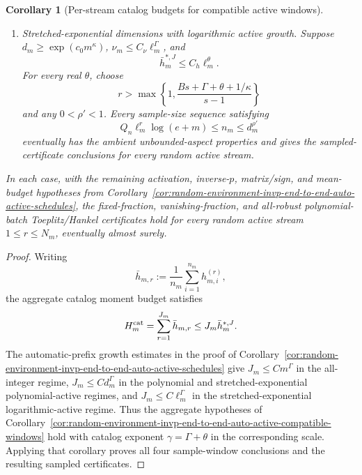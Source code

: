 \documentclass[11pt]{amsart}
\numberwithin{equation}{section}
\newtheorem{corollary}[theorem]{Corollary}
\theoremstyle{definition}
\theoremstyle{remark}
\begin{document}
\begin{corollary}[Per-stream catalog budgets for compatible active windows]
\begin{enumerate}[label=\textup{(\roman*)},leftmargin=2.2em]
\item Stretched-exponential dimensions with logarithmic active growth.  Suppose
\(d_m\ge\exp(c_0m^\kappa)\), \(\nu_m\le C_\nu\ell_m^\Gamma\), and
\[
  \bar h_m^{*,J}\le C_h \ell_m^\theta .
\]
For every real \(\theta\), choose
\[
  r>\max\left\{1,\frac{Bs+\Gamma+\theta+1/\kappa}{s-1}\right\}
\]
and any \(0<\rho'<1\).  Every sample-size sequence satisfying
\[
  Q_n\ell_m^r\log(e+m)\le n_m\le d_m^{\rho'}
\]
eventually has the ambient unbounded-aspect properties and gives the
sampled-certificate conclusions for every random active stream.
\end{enumerate}
In each case, with the remaining activation, inverse-\(p\), matrix/sign, and
mean-budget hypotheses from
Corollary~\ref{cor:random-environment-invp-end-to-end-auto-active-schedules},
the fixed-fraction, vanishing-fraction, and all-robust polynomial-batch
Toeplitz/Hankel certificates hold for every random active stream \(1\le r\le
N_m\), eventually almost surely.
\end{corollary}

\begin{proof}
Writing
\[
  \bar h_{m,r}:=\frac1{n_m}\sum_{i=1}^{n_m}h_{m,i}^{(r)},
\]
the aggregate catalog moment budget satisfies
\[
  H_m^{\rm cat}=\sum_{r=1}^{J_m}\bar h_{m,r}
  \le J_m\bar h_m^{*,J}.
\]
The automatic-prefix growth estimates in the proof of
Corollary~\ref{cor:random-environment-invp-end-to-end-auto-active-schedules}
give \(J_m\le C m^\Gamma\) in the all-integer regime, \(J_m\le C d_m^\Gamma\)
in the polynomial and stretched-exponential polynomial-active regimes, and
\(J_m\le C\ell_m^\Gamma\) in the stretched-exponential logarithmic-active
regime.  Thus the aggregate hypotheses of
Corollary~\ref{cor:random-environment-invp-end-to-end-auto-active-compatible-windows}
hold with catalog exponent \(\gamma=\Gamma+\theta\) in the corresponding
scale.  Applying that corollary proves all four sample-window conclusions and
the resulting sampled certificates.
\end{proof}
\end{document}
